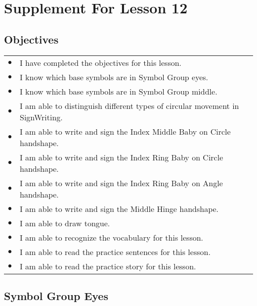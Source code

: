 \documentclass{article}
\begin{document}
\newfontfamily{}
\newfontfamily{}
\newcommand{\bul}{\hfil$\bullet$&}
\renewenvironment{glossary}{\begin{multicols}{5}\begin{center}}{\end{center}\end{multicols}}
\setcounter{secnumdepth}{0}
\setlength{\columnseprule}{1pt}

\section{Supplement For Lesson 12}

\subsection{Objectives}

\begin{tabular}{p{1cm}p{14cm}}
\bul I have completed the objectives for this lesson.\\
\bul I know which base symbols are in Symbol Group eyes.\\
\bul I know which base symbols are in Symbol Group middle.\\
\bul I am able to distinguish different types of circular movement in SignWriting.\\
\bul I am able to write and sign the Index Middle Baby on Circle handshape.\\
\bul I am able to write and sign the Index Ring Baby on Circle handshape.\\
\bul I am able to write and sign the Index Ring Baby on Angle handshape.\\
\bul I am able to write and sign the Middle Hinge handshape.\\
\bul I am able to draw tongue.\\
\bul I am able to recognize the vocabulary for this lesson.\\
\bul I am able to read the practice sentences for this lesson.\\
\bul I am able to read the practice story for this lesson.\\
\end{tabular}

\subsection{Symbol Group Eyes}
\end{document}
